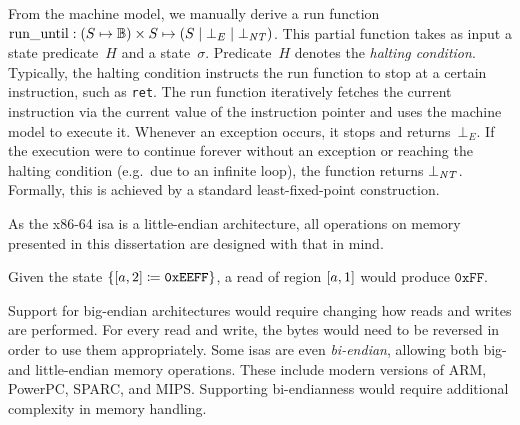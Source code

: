 From the machine model, we manually derive a run function
$\operatorname{run\_until}:(S\mapsto\mathbb{B})\times S\mapsto(S\mid\bot_E\mid\bot_{\mathit{NT}})$.%
This partial function takes as input a state predicate~$H$ and a state~$\sigma$.
Predicate~$H$ denotes the \emph{halting condition}.
Typically, the halting condition instructs the run function to stop
at a certain instruction, such as \lstinline{ret}.
The run function iteratively fetches the current instruction
via the current value of the instruction pointer
and uses the machine model to execute it.
Whenever an exception occurs, it stops and returns~$\bot_E$.
If the execution were to continue forever
without an exception or reaching the halting condition
(e.g.\ due to an infinite loop),
the function returns $\bot_{\mathit{NT}}$.
Formally, this is achieved by a standard least-fixed-point construction.


As the x86-64 \ac{isa} is a little-endian architecture,
all operations on memory presented in this dissertation are designed with that in mind.
\begin{example}
  Given the state $\{[a,2]\coloneqq\mathtt{0xEEFF}\}$,
  a read of region $[a,1]$ would produce $\mathtt{0xFF}$.
\end{example}
Support for big-endian architectures would require changing how reads and writes
are performed. For every read and write, the bytes would need to be reversed
in order to use them appropriately.
Some \acp{isa} are even \emph{bi-endian}, allowing both big- and little-endian
memory operations. These include modern versions of ARM, PowerPC, SPARC, and MIPS.
Supporting bi-endianness would require additional complexity in memory handling.

